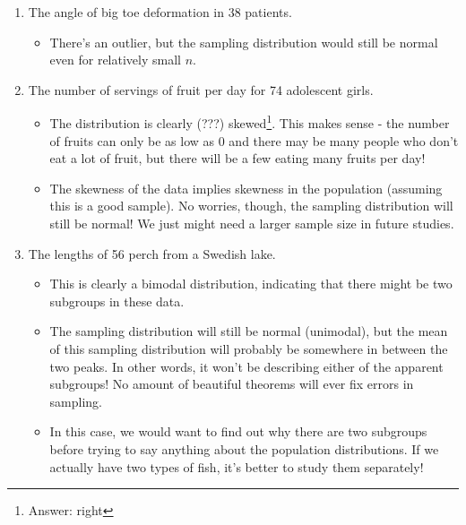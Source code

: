 \documentclass[
  letterpaper,
  DIV=11,
  numbers=noendperiod]{scrreprt}
\providecommand{\tightlist}{%
  \setlength{\itemsep}{0pt}\setlength{\parskip}{0pt}}\usepackage{longtable,booktabs,array}
\begin{document}
\begin{enumerate}
\def\labelenumi{\alph{enumi}.}
\tightlist
\item
  The angle of big toe deformation in 38 patients.

  \begin{itemize}
  \tightlist
  \item
    There's an outlier, but the sampling distribution would still be
    normal even for relatively small \(n\).
  \end{itemize}
\item
  The number of servings of fruit per day for 74 adolescent girls.

  \begin{itemize}
  \tightlist
  \item
    The distribution is clearly (???) skewed\footnote{Answer: right}.
    This makes sense - the number of fruits can only be as low as 0 and
    there may be many people who don't eat a lot of fruit, but there
    will be a few eating many fruits per day!
  \item
    The skewness of the data implies skewness in the population
    (assuming this is a good sample). No worries, though, the sampling
    distribution will still be normal! We just might need a larger
    sample size in future studies.
  \end{itemize}
\item
  The lengths of 56 perch from a Swedish lake.

  \begin{itemize}
  \tightlist
  \item
    This is clearly a bimodal distribution, indicating that there might
    be two subgroups in these data.
  \item
    The sampling distribution will still be normal (unimodal), but the
    mean of this sampling distribution will probably be somewhere in
    between the two peaks. In other words, it won't be describing either
    of the apparent subgroups! No amount of beautiful theorems will ever
    fix errors in sampling.
  \item
    In this case, we would want to find out why there are two subgroups
    before trying to say anything about the population distributions. If
    we actually have two types of fish, it's better to study them
    separately!
  \end{itemize}
\end{enumerate}
\end{document}
